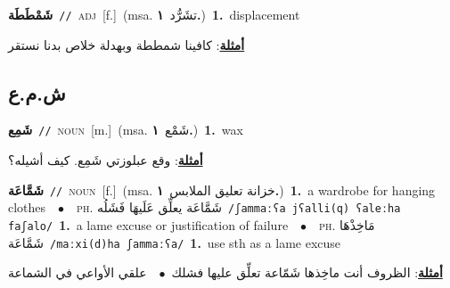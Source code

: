 \documentclass[10pt,a4paper,twoside]{article} %
\begin{document}
\begin{multicols}{2}
{\setlength\topsep{0pt}\textbf{\foreignlanguage{arabic}{شَمْطَطَة}}\ {\color{gray}\texttt{//}\color{black}}\ \textsc{adj}\ [f.]\ \color{gray}(msa. \foreignlanguage{arabic}{تشَرُّد}~\foreignlanguage{arabic}{\textbf{١.}})\color{black}\ \textbf{1.}~displacement\  \begin{flushright}\color{gray}\foreignlanguage{arabic}{\textbf{\underline{\foreignlanguage{arabic}{أمثلة}}}: كافينا شمططة وبهدلة خلاص بدنا نستقر}\end{flushright}\color{black}} \vspace{2mm}

\vspace{-3mm}
\subsection*{\color{blue}\foreignlanguage{arabic}{ش.م.ع}\color{blue}{}} 

{\setlength\topsep{0pt}\textbf{\foreignlanguage{arabic}{شَمِع}}\ {\color{gray}\texttt{//}\color{black}}\ \textsc{noun}\ [m.]\ \color{gray}(msa. \foreignlanguage{arabic}{شَمْع}~\foreignlanguage{arabic}{\textbf{١.}})\color{black}\ \textbf{1.}~wax\  \begin{flushright}\color{gray}\foreignlanguage{arabic}{\textbf{\underline{\foreignlanguage{arabic}{أمثلة}}}: وقع عبلوزتي شَمِع. كيف أشيله؟}\end{flushright}\color{black}} \vspace{2mm}

{\setlength\topsep{0pt}\textbf{\foreignlanguage{arabic}{شَمَّاعَة}}\ {\color{gray}\texttt{//}\color{black}}\ \textsc{noun}\ [f.]\ \color{gray}(msa. \foreignlanguage{arabic}{خزانة تعليق الملابس}~\foreignlanguage{arabic}{\textbf{١.}})\color{black}\ \textbf{1.}~a wardrobe for hanging clothes\ \ $\bullet$\ \ \textsc{ph.} \color{gray} \foreignlanguage{arabic}{شَمَّاعَة يعلِّق عَلَيهَا فَشَلُه}\color{black}\ {\color{gray}\texttt{/{\sffamily ʃammaːʕa jʕalli(q) ʕaleːha faʃalo}/}\color{black}}\ \textbf{1.}~a lame excuse or justification of failure\ \ $\bullet$\ \ \textsc{ph.} \color{gray} \foreignlanguage{arabic}{مَاخِذْهَا شَمَّاعَة}\color{black}\ {\color{gray}\texttt{/{\sffamily maːxi(d)ha ʃammaːʕa}/}\color{black}}\ \textbf{1.}~use sth as a lame excuse\  \begin{flushright}\color{gray}\foreignlanguage{arabic}{\textbf{\underline{\foreignlanguage{arabic}{أمثلة}}}: الظروف أنت ماخِذها شَمّاعة تعلِّق عليها فشلك\ $\bullet$\ \  علقي الأواعي في الشماعة}\end{flushright}\color{black}} \vspace{2mm}


\end{multicols}
\end{document}
